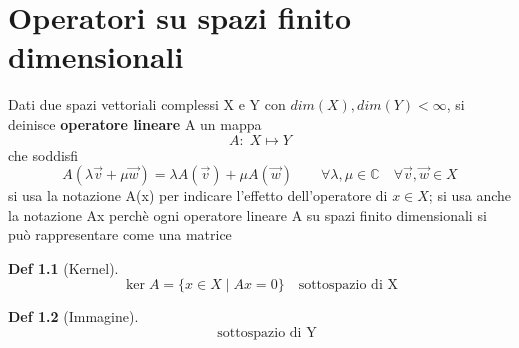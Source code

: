 \documentclass[a4paper,11pt]{report}
\theoremstyle{remark}
\theoremstyle{definition}
\newtheorem*{Def}{Def}
\newcommand{\C}{\mathbb{C}}
\begin{document}
\chapter{Operatori su spazi finito dimensionali}

Dati due spazi vettoriali complessi X e Y con $dim(X),dim(Y)<\infty$, si deinisce \textbf{operatore lineare} A un mappa 
\begin{equation*}
	A: \; X \mapsto Y
\end{equation*}
che soddisfi 
\begin{equation*}
	A(\lambda\vec{v}+\mu\vec{w}) = \lambda A(\vec{v})+ \mu A(\vec{w}) \qquad \forall \lambda,\mu \in \C \quad \forall \vec{v},\vec{w}\in X
\end{equation*}
si usa la notazione A(x) per indicare l'effetto dell'operatore di $x\in X$; si usa anche la notazione Ax perchè ogni operatore lineare A su spazi finito dimensionali si può rappresentare come una matrice

\begin{Def}[Kernel]
	\begin{equation*}
		\ker{A} = \{x \in X \; |\; Ax=0\} \quad \text{sottospazio di X}
	\end{equation*}
\end{Def}

\begin{Def}[Immagine]
	\begin{equation*} \quad \text{sottospazio di Y}
	\end{equation*}
\end{Def}
\end{document}
